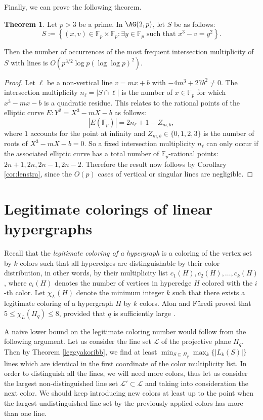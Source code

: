 \documentclass[10pt]{article}
\newcommand{\cL}{\mathcal{L}}
\theoremstyle{definition}
\newtheorem{theorem}[thm]{Theorem}
\newcommand{\zs}[1]{\textcolor{magenta}{\textbf{#1}}}
\newcommand{\zsst}[1]{%
	\bgroup
	\markoverwith{\textcolor{magenta}{\rule[0.5ex]{2pt}{1.2pt}}}%
	\ULon{#1}%
	\egroup
}
\begin{document}
	Finally, we can prove the following theorem.
	\begin{theorem}
		Let $p > 3$ be a prime. In $\AG(2, p)$, let $S$ be as follows:
		\[
		S := \left\{ (x, v) \in \mathbb{F}_p \times \mathbb{F}_p : \exists y \in \mathbb{F}_p \text{ such that } x^3 - v = y^2 \right\}. 
		\]
		
		Then the number of occurrences of the most frequent intersection multiplicity of $S$ with lines is $O(p^{3/2} \log p (\log \log p)^2)$.
	\end{theorem}
	
	\begin{proof}
		Let $\ell$ be a non-vertical line $v = mx + b$ with $-4m^3 + 27b^2 \neq 0$. The intersection multiplicity $n_{\ell} = |S \cap \ell|$ is the number of $x \in \mathbb{F}_p$ for which $x^3 - mx - b$ is a quadratic residue. This relates to the rational points of the elliptic curve $E: Y^2 = X^3 - mX - b$ as follows:
		\[
		|E(\mathbb{F}_p)| = 2n_{\ell} + 1 - Z_{m,b},
		\]
		where $1$ accounts for the point at infinity and $Z_{m,b} \in \{0, 1, 2, 3\}$ is the number of roots of $X^3-mX-b = 0$. So a fixed intersection multiplicity $n_{\ell}$ can only occur if the
		associated elliptic curve has a total number of $\mathbb{F}_p$-rational points: $2n+1, 2n, 2n-1, 2n-2$.  
		Therefore the result now follows by Corollary \ref{cor:lenstra}, since the $O(p)$ cases of vertical or singular lines are negligible.
	\end{proof}
	
	
	\section[Legitimate colorings of linear hypergraphs]%
	{Legitimate colorings of linear hypergraphs}\label{sec:appl}
	
	Recall that  the \textit{ legitimate coloring of a hypergraph} is a coloring of the vertex set by $k$ colors such that all hyperedges are distinguishable by their color distribution, in other words, by their multiplicity list $c_1(H), c_2(H), \ldots, c_k(H)$, where $c_i(H)$ denotes the number of vertices in hyperedge $H$ colored with the $i$-th color. Let $\chi_L(H)$ denote the minimum integer $k$ such that there exists a legitimate
	coloring of a hypergraph $H$ by $k$  colors.
	Alon and Füredi proved that $5\le \chi_L(\Pi_q)\le 8$, provided that $q$ is sufficiently large \cite{Alon-Furedi}. 
	
	A naive lower bound on  the legitimate coloring number would follow from the following argument. Let us consider the line set $\cL$ of the projective plane $\Pi_q$. Then by Theorem \ref{leggyakoribb}, we find at least $\min_{ S\subseteq \Pi_q} \max_k \{|L_k(S)|\}$ lines which are identical in the first coordinate of the color multiplicity list.  In order to distinguish all the lines, we will need more colors, thus let us consider the largest non-distinguished line set $\cL'\subset \cL$ and taking into consideration the next color. We should keep introducing new colors at least up to the point when the largest undistinguished line set by the previously applied colors has more than one line.
	
\end{document}
